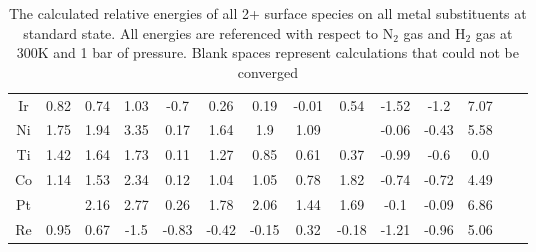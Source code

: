\begin{table}
\begin{center}
\begin{tabular}{| c | c | c | c | c | c | c | c | c | c | c | c | c | c |}
Ir & 0.82 & 0.74 & 1.03 & -0.7 & 0.26 & 0.19 & -0.01 & 0.54 & -1.52 & -1.2 & 7.07 \\
Ni & 1.75 & 1.94 & 3.35 & 0.17 & 1.64 & 1.9 & 1.09 &  & -0.06 & -0.43 & 5.58 \\
Ti & 1.42 & 1.64 & 1.73 & 0.11 & 1.27 & 0.85 & 0.61 & 0.37 & -0.99 & -0.6 & 0.0 \\
Co & 1.14 & 1.53 & 2.34 & 0.12 & 1.04 & 1.05 & 0.78 & 1.82 & -0.74 & -0.72 & 4.49 \\
Pt &  & 2.16 & 2.77 & 0.26 & 1.78 & 2.06 & 1.44 & 1.69 & -0.1 & -0.09 & 6.86 \\
Re & 0.95 & 0.67 & -1.5 & -0.83 & -0.42 & -0.15 & 0.32 & -0.18 & -1.21 & -0.96 & 5.06 \\
\hline
\end{tabular}
\end{center}
\caption{The calculated relative energies of all 2+ surface species on all metal substituents at standard state. All energies are referenced with respect to N$_2$ gas and H$_2$ gas at 300K and 1 bar of pressure. Blank spaces represent calculations that could not be converged}
\label{table:energies}
\end{table}

